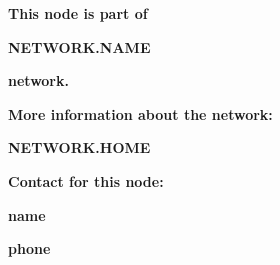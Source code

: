 \documentclass[a5paper,landscape]{article}
\begin{document}
\thispagestyle{empty}

\center

\vfill

\textcolor{ca3a3a3}{\large\bf This node is part of}

\vspace{1em}

\textcolor{c738c72}{\Huge\bf {{ NETWORK.NAME }} }

\vspace{1em}

\textcolor{ca3a3a3}{\large\bf network.}

\vfill

\textcolor{ca3a3a3}{\large\bf More information about the network:}

\vspace{1em}

\textcolor{c738c72}{\Huge\bf {{ NETWORK.HOME }}}

\vfill

\textcolor{ca3a3a3}{\Large\bf Contact for this node:}

\vspace{1em}

\textcolor{c738c72}{\Huge\bf {{ name }} }

\vspace{0.5em}

\textcolor{c738c72}{\Huge\bf {{ phone }} }

\vfill
\end{document}
